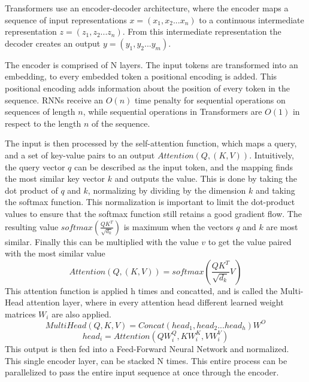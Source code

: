 Transformers use an encoder-decoder architecture, where the encoder maps a sequence of input representations \(x = (x_1,x_2 ... x_n)\) to a continuous intermediate representation \(z = (z_1,z_2 ... z_n)\). From this intermediate representation the decoder creates an output \(y = (y_1,y_2 ... y_m)\).

The encoder is comprised of N layers. The input tokens are transformed into an embedding, to every embedded token a positional encoding is added. This positional encoding adds information about the position of every token in the sequence. RNNs receive an \(O(n)\) time penalty for sequential operations on sequences of length \(n\), while sequential operations in Transformers are \(O(1)\) in respect to the length \(n\) of the sequence.

The input is then processed by the self-attention function, which maps a query, and a set of key-value pairs to an output \(Attention(Q,(K,V))\). Intuitively, the query vector \(q\) can be described as the input token, and the mapping finds the most similar key vector \(k\) and outputs the value. This is done by taking the dot product of \(q\) and \(k\), normalizing by dividing by the dimension \(k\) and taking the softmax function. This normalization is important to limit the dot-product values to ensure that the softmax function still retains a good gradient flow. The resulting value \(softmax(\frac{QK^T}{\sqrt{d_k}})\) is maximum when the vectors \(q\) and \(k\) are most similar. Finally this can be multiplied with the value \(v\) to get the value paired with the most similar value \[Attention(Q,(K,V)) = softmax(\frac{QK^T}{\sqrt{d_k}}V)\]
This attention function is applied h times and concatted, and is called the Multi-Head attention layer, where in every attention head different learned weight matrices \(W_i\) are also applied. 
\[MultiHead(Q,K,V) = Concat(head_1, head_2 ... head_h) W^O\]
\[ head_i = Attention(QW^Q_i,KW^K_i,VW^V_i)\] This output is then fed into a Feed-Forward Neural Network and normalized. This single encoder layer, can be stacked N times. This entire process can be parallelized to pass the entire input sequence at once through the encoder. 

